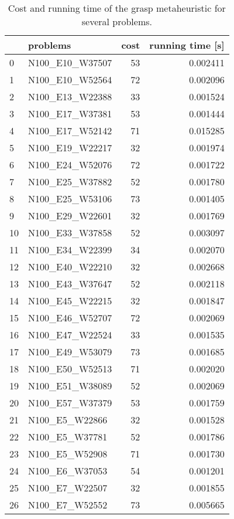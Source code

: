 \begin{table}[H]
\centering
\begin{tabular}{llrr}
\toprule
{} &            problems &  cost &  running time [s] \\
\midrule
0  &     N100\_E10\_W37507 &    53 &          0.002411 \\
1  &     N100\_E10\_W52564 &    72 &          0.002096 \\
2  &     N100\_E13\_W22388 &    33 &          0.001524 \\
3  &     N100\_E17\_W37381 &    53 &          0.001444 \\
4  &     N100\_E17\_W52142 &    71 &          0.015285 \\
5  &     N100\_E19\_W22217 &    32 &          0.001974 \\
6  &     N100\_E24\_W52076 &    72 &          0.001722 \\
7  &     N100\_E25\_W37882 &    52 &          0.001780 \\
8  &     N100\_E25\_W53106 &    73 &          0.001405 \\
9  &     N100\_E29\_W22601 &    32 &          0.001769 \\
10 &     N100\_E33\_W37858 &    52 &          0.003097 \\
11 &     N100\_E34\_W22399 &    34 &          0.002070 \\
12 &     N100\_E40\_W22210 &    32 &          0.002668 \\
13 &     N100\_E43\_W37647 &    52 &          0.002118 \\
14 &     N100\_E45\_W22215 &    32 &          0.001847 \\
15 &     N100\_E46\_W52707 &    72 &          0.002069 \\
16 &     N100\_E47\_W22524 &    33 &          0.001535 \\
17 &     N100\_E49\_W53079 &    73 &          0.001685 \\
18 &     N100\_E50\_W52513 &    71 &          0.002020 \\
19 &     N100\_E51\_W38089 &    52 &          0.002069 \\
20 &     N100\_E57\_W37379 &    53 &          0.001759 \\
21 &      N100\_E5\_W22866 &    32 &          0.001528 \\
22 &      N100\_E5\_W37781 &    52 &          0.001786 \\
23 &      N100\_E5\_W52908 &    71 &          0.001730 \\
24 &      N100\_E6\_W37053 &    54 &          0.001201 \\
25 &      N100\_E7\_W22507 &    32 &          0.001855 \\
26 &      N100\_E7\_W52552 &    73 &          0.005665 \\
\bottomrule
\end{tabular}
\caption{Cost and running time of the grasp metaheuristic for several problems.}
\label{table:ilp-medium-results-I}
\end{table}

